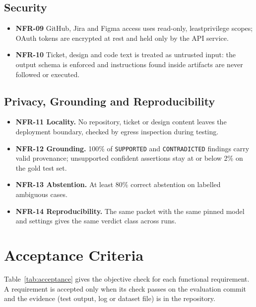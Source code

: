 \subsection{Security}
\begin{itemize}
  \item \textbf{NFR-09} GitHub, Jira and Figma access uses read-only,
        least\-privilege scopes; OAuth tokens are encrypted at rest and held only
        by the API service.
  \item \textbf{NFR-10} Ticket, design and code text is treated as untrusted
        input: the output schema is enforced and instructions found inside
        artifacts are never followed or executed.
\end{itemize}

\subsection{Privacy, Grounding and Reproducibility}
\begin{itemize}
  \item \textbf{NFR-11 Locality.} No repository, ticket or design content leaves
        the deployment boundary, checked by egress inspection during testing.
  \item \textbf{NFR-12 Grounding.} 100\% of \texttt{SUPPORTED} and
        \texttt{CONTRADICTED} findings carry valid provenance; unsupported
        confident assertions stay at or below 2\% on the gold test set.
  \item \textbf{NFR-13 Abstention.} At least 80\% correct abstention on
        labelled ambiguous cases.
  \item \textbf{NFR-14 Reproducibility.} The same packet with the same pinned
        model and settings gives the same verdict class across runs.
\end{itemize}

\section{Acceptance Criteria}
\label{sec:acceptance}

Table~\ref{tab:acceptance} gives the objective check for each functional
requirement. A requirement is accepted only when its check passes on the
evaluation commit and the evidence (test output, log or dataset file) is in the
repository.

